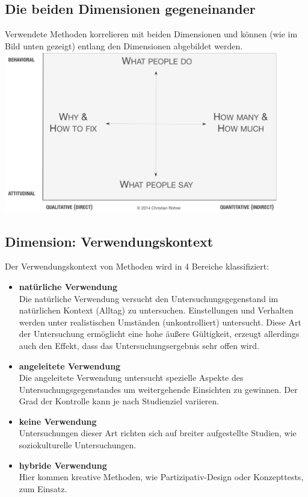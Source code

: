\documentclass{article}
\begin{document}
\subsection*{Die beiden Dimensionen gegeneinander}
Verwendete Methoden korrelieren mit beiden Dimensionen und können (wie im Bild unten gezeigt) entlang den Dimensionen abgebildet werden.\\
\includegraphics[width=12cm]{methoddim.jpg}

\subsection*{Dimension: Verwendungskontext}

Der Verwendungskontext von Methoden wird in 4 Bereiche klassifiziert:
\begin{itemize}
\item \textbf{natürliche Verwendung}\\
Die natürliche Verwendung versucht den Untersuchungsgegenstand im natürlichen Kontext (Alltag) zu untersuchen. Einstellungen und Verhalten werden unter realistischen Umständen (unkontrolliert) untersucht. Diese Art der Untersuchung ermöglicht eine hohe äußere Gültigkeit, erzeugt allerdings auch den Effekt, dass das Untersuchungsergebnis sehr offen wird.  
\item \textbf{angeleitete Verwendung}\\
Die angeleitete Verwendung untersucht spezielle Aspekte des Untersuchungsgegenstandes um weitergehende Einsichten zu gewinnen. Der Grad der Kontrolle kann je nach Studienziel variieren.
\item \textbf{keine Verwendung}\\
Untersuchungen dieser Art richten sich auf breiter aufgestellte Studien, wie soziokulturelle Untersuchungen. 
\item \textbf{hybride Verwendung}\\
Hier kommen kreative Methoden, wie Partizipativ-Design oder Konzepttests, zum Einsatz.
\end{itemize}
\end{document}
